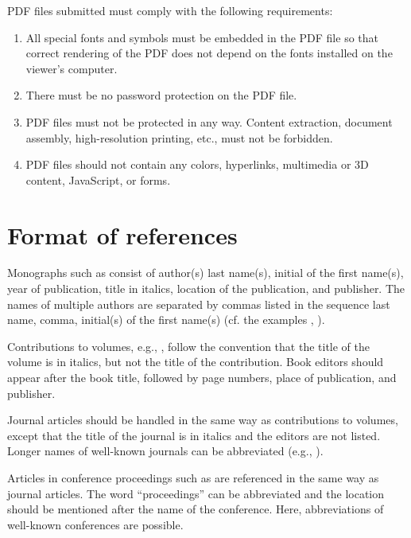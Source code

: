 \documentclass{tls}
\begin{document}
PDF files submitted must comply with the following requirements:

\begin{enumerate}
  \item All special fonts and symbols must be embedded in the PDF file so that correct rendering of the PDF does not depend on the fonts installed on the viewer's computer.
  \item There must be no password protection on the PDF file.
  \item PDF files must not be protected in any way. Content extraction, document assembly, high-resolution printing, etc., must not be forbidden.
  \item PDF files should not contain any colors, hyperlinks, multimedia or 3D content, JavaScript, or forms.
\end{enumerate}

\section{Format of references}

Monographs such as \citet{Fant:1960} consist of author(s) last name(s), initial of the first name(s), year of publication, title in italics, location of the publication, and publisher. The names of multiple authors are separated by commas listed in the sequence last name, comma, initial(s) of the first name(s) (cf. the examples , ).

Contributions to volumes, e.g., \citet{Stevens:1999}, follow the convention that the title of the volume is in italics, but not the title of the contribution. Book editors should appear after the book title, followed by page numbers, place of publication, and publisher.

Journal articles should be handled in the same way as contributions to volumes, except that the title of the journal is in italics and the editors are not listed. Longer names of well-known journals can be abbreviated (e.g., ).

Articles in conference proceedings such as \citet{Ladefoged:2003} are referenced in the same way as journal articles. The word ``proceedings'' can be abbreviated and the location should be mentioned after the name of the conference. Here, abbreviations of well-known conferences are possible.


\end{document}
